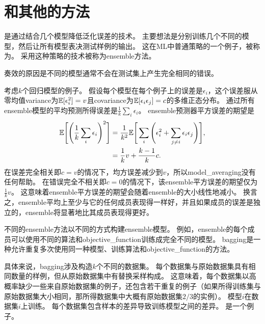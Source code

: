 \section{和其他的方法}
\label{sec:bagging_and_other_ensemble_methods}
是通过结合几个模型降低泛化误差的技术\citep{ML:Breiman:bagging}。
主要想法是分别训练几个不同的模型，然后让所有模型表决测试样例的输出。
这在\gls{ML}中普通策略的一个例子，被称为。
采用这种策略的技术被称为\gls{ensemble}方法。

奏效的原因是不同的模型通常不会在测试集上产生完全相同的错误。

考虑$k$个回归模型的例子。
假设每个模型在每个例子上的误差是$\epsilon_i$，这个误差服从零均值\gls{variance}为$\mathbb{E}[\epsilon_i^2] = v$且\gls{covariance}为$\mathbb{E}[\epsilon_i \epsilon_j] = c$的多维正态分布。
通过所有\gls{ensemble}模型的平均预测所得误差是$\frac{1}{k} \sum_i \epsilon_i$。 
\gls{ensemble}预测器平方误差的期望是
\begin{align}
 \mathbb{E} \Bigg[\Bigg(\frac{1}{k} \sum_i \epsilon_i \Bigg)^2\Bigg] &= \frac{1}{k^2} 
 \mathbb{E} \Bigg[\sum_i \Bigg(\epsilon_i^2 + \sum_{j \neq i} \epsilon_i \epsilon_j\Bigg)\Bigg], \\
&= \frac{1}{k} v + \frac{k-1}{k} c .                             
\end{align}
在误差完全相关即$c=v$的情况下，均方误差减少到$v$，所以\gls{model_averaging}没有任何帮助。
在错误完全不相关即$c =0$的情况下，该\gls{ensemble}平方误差的期望仅为$\frac{1}{k}v$。
这意味着\gls{ensemble}平方误差的期望会随着\gls{ensemble}的大小线性地减小。
换言之，\gls{ensemble}平均上至少与它的任何成员表现得一样好，并且如果成员的误差是独立的，\gls{ensemble}将显著地比其成员表现得更好。

不同的\gls{ensemble}方法以不同的方式构建\gls{ensemble}模型。
例如，\gls{ensemble}的每个成员可以使用不同的算法和\gls{objective_function}训练成完全不同的模型。
\gls{bagging}是一种允许重复多次使用同一种模型、训练算法和\gls{objective_function}的方法。


具体来说，\gls{bagging}涉及构造$k$个不同的数据集。
每个数据集与原始数据集具有相同数量的样例，但从原始数据集中有替换采样构成。
这意味着，每个数据集以高概率缺少一些来自原始数据集的例子，还包含若干重复的例子（如果所得训练集与原始数据集大小相同，那所得数据集中大概有原始数据集$2/3$的实例）。
模型$i$在数据集$i$上训练。
每个数据集包含样本的差异导致训练模型之间的差异。
是一个例子。


